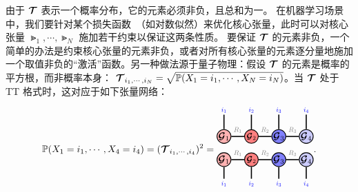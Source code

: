 由于 $\bm{\mathcal{T}}$ 表示一个概率分布，它的元素必须非负，且总和为一。
在机器学习场景中，我们要针对某个损失函数~（如对数似然）来优化核心张量，此时可以对核心张量 $\Gt_1,\cdots,\Gt_N$ 施加若干约束以保证这两条性质。 
要保证 $\bm{\mathcal{T}}$ 的元素非负，一个简单的办法是约束核心张量的元素非负，或者对所有核心张量的元素逐分量地施加一个取值非负的“激活”函数。另一种做法源于量子物理：假设 $\bm{\mathcal{T}}$ 的元素是概率的平方根，而非概率本身： $\bm{\mathcal{T}}_{i_1,\cdots,i_N} = \sqrt{\mathbb{P}(X_1=i_1,\cdots,X_N=i_N)}$。当 $\bm{\mathcal{T}}$ 处于 TT 格式时，这对应于如下张量网络：
$$
\PP(X_1=i_1,\cdots,X_4=i_4) = (\Tt_{i_1,\cdots,i_4})^2 = 
\begin{tikzpicture}[baseline=\baseline]
    \tikzset{tensor/.style = {minimum size = 0.5cm,shape = circle,thick,draw=black,inner sep = 0pt}, edge/.style   = {thick,line width=.4mm},every loop/.style={}}
    \def\y{-0.35}
    \def\x{0}
  \node[tensor,fill=red!30!white] (D) at (\x-1,\y){$\Gt_1$};
  \node[tensor,fill=red!50!white] (A) at (\x,\y){\scalebox{0.85}{$\Gt_2$}};
  \node[tensor,fill=blue!50!white] (B) at (\x+1,\y){$\Gt_3$};
   \node[tensor,fill=blue!20!white] (C) at (\x+2,\y){$\Gt_4$};
   \node[tensor,fill=red!30!white] (G1) at (\x-1,\y+0.85){$\Gt_1$};
  \node[tensor,fill=red!50!white] (G2) at (\x,\y+0.85){\scalebox{0.85}{$\Gt_2$}};
  \node[tensor,fill=blue!50!white] (G3) at (\x+1,\y+0.85){$\Gt_3$};
   \node[tensor,fill=blue!20!white] (G4) at (\x+2,\y+0.85){$\Gt_4$};
    \draw[edge](G1) -- (\x-1,\y+1.65)node [very near end, above]{\scalebox{0.7} {\indcolor{$i_1$}}};
    \draw[edge](G2) -- (\x,\y+1.65)node [very near end, above]{\scalebox{0.7} {\indcolor{$i_2$}}};
    \draw[edge](G3) -- (\x+1,\y+1.65)node [very near end, above]{\scalebox{0.7}{\indcolor{$i_3$}}};
    \draw[edge](G4) -- (\x+2,\y+1.65)node [very near end, above]{\scalebox{0.7}{\indcolor{$i_4$}}};
    \draw[edge](G1) -- (G2)node [midway,above] {\edgelabel{$R_1$}};
    \draw[edge](G2) -- (G3)node [midway,above] {\edgelabel{$R_2$}};
    \draw[edge](G3) -- (G4)node [midway,above] {\edgelabel{$R_3$}};
    \draw[edge](A) -- (\x,\y-0.7)node [very near end, below] {\scalebox{0.7}{\indcolor{$i_2$}}};
    \draw[edge](B) -- (\x+1,\y-0.7)node [very near end, below]{\scalebox{0.7} {\indcolor{$i_3$}}};
    \draw[edge](C) -- (\x+2,\y-0.7)node [very near end, below] {\scalebox{0.7}{\indcolor{$i_4$}}};
     \draw[edge](D) -- (\x-1,\y-0.7)node [very near end, below] {\scalebox{0.7}{\indcolor{$i_1$}}};
    \draw[edge](D) -- (A) node [midway,above] {\edgelabel{$R_1$}};
    \draw[edge](A) -- (B) node [midway,above] {\edgelabel{$R_2$}};
    \draw[edge](B) -- (C) node [midway,above] {\edgelabel{$R_3$}};
\end{tikzpicture}
.
$$

